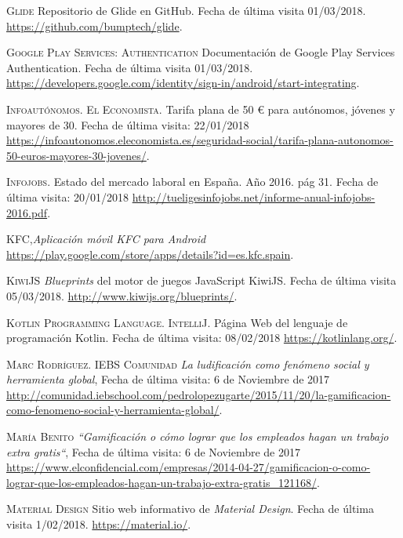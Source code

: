 \documentclass[twoside]{report}
\begin{document}
\begin{thebibliography}{a}
 \textsc{Glide} 
Repositorio de Glide en GitHub. Fecha de última visita 01/03/2018. \url{https://github.com/bumptech/glide}.

 \textsc{Google Play Services: Authentication} 
Documentación de Google Play Services Authentication. Fecha de última visita 01/03/2018. \url{https://developers.google.com/identity/sign-in/android/start-integrating}.

 \textsc{Infoautónomos. El Economista}. Tarifa plana de 50 \euro \hspace{0.1cm} para autónomos, jóvenes y mayores de 30. Fecha de última visita: 22/01/2018 \url{https://infoautonomos.eleconomista.es/seguridad-social/tarifa-plana-autonomos-50-euros-mayores-30-jovenes/}.

 \textsc{Infojobs}. Estado del mercado laboral en España. Año 2016. pág 31. Fecha de última visita: 20/01/2018 \url{http://tueligesinfojobs.net/informe-anual-infojobs-2016.pdf}.

 \textsc{KFC},\textit{Aplicación móvil KFC para Android} \url{https://play.google.com/store/apps/details?id=es.kfc.spain}.

 \textsc{KiwiJS} 
\textit{Blueprints} del motor de juegos JavaScript KiwiJS. Fecha de última visita 05/03/2018. \url{http://www.kiwijs.org/blueprints/}.

 \textsc{Kotlin Programming Language. IntelliJ}. Página Web del lenguaje de programación Kotlin. Fecha de última visita: 08/02/2018 \url{https://kotlinlang.org/}.

 \textsc{Marc Rodríguez. IEBS Comunidad} \textit{La ludificación como fenómeno social y herramienta global}, Fecha de última visita: 6 de Noviembre de 2017 \url{http://comunidad.iebschool.com/pedrolopezugarte/2015/11/20/la-gamificacion-como-fenomeno-social-y-herramienta-global/}.  

 \textsc{María Benito} \textit{“Gamificación o cómo lograr que los empleados hagan un trabajo extra gratis“}, Fecha de última visita: 6 de Noviembre de 2017 \url{https://www.elconfidencial.com/empresas/2014-04-27/gamificacion-o-como-lograr-que-los-empleados-hagan-un-trabajo-extra-gratis_121168/}. 

 \textsc{Material Design} 
Sitio web informativo de \textit{Material Design}. Fecha de última visita 1/02/2018. \url{https://material.io/}.


\end{thebibliography}
\end{document}
